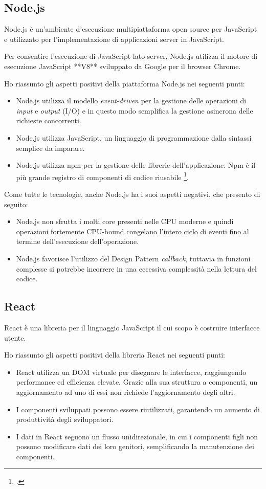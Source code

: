 \subsection{Node.js}

Node.js è un'ambiente d'esecuzione multipiattaforma open source per JavaScript e utilizzato per l'implementazione di applicazioni server in JavaScript.

Per consentire l'esecuzione di JavaScript lato server, Node.js utilizza il motore di esecuzione JavaScript **V8** sviluppato da Google per il browser Chrome.

Ho riassunto gli aspetti positivi della piattaforma Node.js nei seguenti punti: 
\begin{itemize}
  \item Node.js utilizza il modello \emph{event-driven} per la gestione delle operazioni di \emph{input} e \emph{output} (I/O) e in questo modo semplifica la gestione asincrona delle richieste concorrenti.
  \item Node.js utilizza JavaScript, un linguaggio di programmazione dalla sintassi semplice da imparare.
  \item Node.js utilizza npm per la gestione delle librerie dell'applicazione. Npm è il più grande registro di componenti di codice riusabile \footcite{}.
\end{itemize}

Come tutte le tecnologie, anche Node.js ha i suoi aspetti negativi, che presento di seguito:
\begin{itemize}
  \item Node.js non sfrutta i molti core presenti nelle CPU moderne e quindi operazioni fortemente CPU-bound congelano l'intero ciclo di eventi fino al termine dell'esecuzione dell'operazione.
  \item Node.js favorisce l'utilizzo del Design Pattern \emph{callback}, tuttavia in funzioni complesse si potrebbe incorrere in una eccessiva complessità nella lettura del codice.
\end{itemize}

\subsection{React}

React è una libreria per il linguaggio JavaScript il cui scopo è costruire interfacce utente.

Ho riassunto gli aspetti positivi della libreria React nei seguenti punti:
\begin{itemize}
	\item React utilizza un DOM virtuale per disegnare le interfacce, raggiungendo performance ed efficienza elevate. Grazie alla sua struttura a componenti, un aggiornamento ad uno di essi non richiede l'aggiornamento degli altri.
	\item I componenti sviluppati possono essere riutilizzati, garantendo un aumento di produttività degli sviluppatori.
	\item I dati in React seguono un flusso unidirezionale, in cui i componenti figli non possono modificare dati dei loro genitori, semplificando la manutenzione dei componenti.
\end{itemize}

